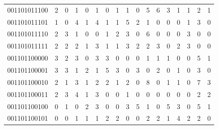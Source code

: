 \documentclass[10pt,a4paper]{article}
\begin{document}
\begin{longtable}{ |c|c|c|c|c|c|c|c|c|c|c|c|c|c|c|c|c| }
    001101011100              & 2                            & 0                                & 1                            & 0                              & 1   & 0   & 1   & 1   & 0   & 5   & 6   & 3   & 1   & 1   & 2   & 1   \\
    001101011101              & 1                            & 0                                & 4                            & 1                              & 4   & 1   & 1   & 5   & 2   & 1   & 0   & 0   & 0   & 1   & 3   & 0   \\
    001101011110              & 2                            & 3                                & 1                            & 0                              & 0   & 1   & 2   & 3   & 0   & 6   & 0   & 0   & 0   & 3   & 0   & 0   \\
    001101011111              & 2                            & 2                                & 2                            & 1                              & 3   & 1   & 1   & 3   & 2   & 2   & 3   & 0   & 2   & 3   & 0   & 0   \\
    001101100000              & 3                            & 2                                & 3                            & 0                              & 3   & 3   & 0   & 0   & 0   & 1   & 1   & 1   & 0   & 0   & 5   & 1   \\
    001101100001              & 3                            & 3                                & 1                            & 2                              & 1   & 5   & 3   & 0   & 3   & 0   & 2   & 0   & 1   & 0   & 3   & 0   \\
    001101100010              & 2                            & 1                                & 3                            & 1                              & 2   & 2   & 1   & 2   & 0   & 8   & 0   & 1   & 1   & 0   & 7   & 3   \\
    001101100011              & 2                            & 3                                & 4                            & 1                              & 3   & 0   & 0   & 1   & 0   & 0   & 0   & 0   & 0   & 0   & 2   & 2   \\
    001101100100              & 0                            & 1                                & 0                            & 2                              & 3   & 0   & 0   & 3   & 5   & 1   & 0   & 5   & 3   & 0   & 5   & 1   \\
    001101100101              & 0                            & 0                                & 1                            & 1                              & 1   & 2   & 2   & 0   & 0   & 2   & 2   & 1   & 4   & 2   & 2   & 0   \\

\end{longtable}
\end{document}
